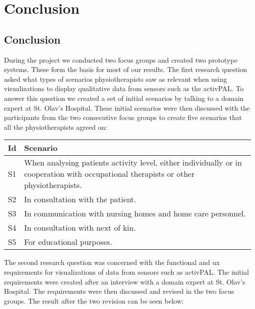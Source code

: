 \chapter{Conclusion}



\section{Conclusion}
During the project we conducted two focus groups and created two prototype systems. These form the basis for most of our results. The first research question asked what types of scenarios physiotherapists saw as relevant when using visualizations to display qualitative data from sensors such as the activPAL. To answer this question we created a set of initial scenarios by talking to a domain expert at St. Olav's Hospital. These initial scenarios were then discussed with the participants from the two consecutive focus groups to create five scenarios that all the physiotherapists agreed on:
\begin{table}[h!]
  \begin{tabular}{|c|p{10cm}|}
    \hline
    \textbf{Id} & \textbf{Scenario} \\ \hline
    S1 & When analysing patients activity level, either individually or in cooperation with occupational therapists or other physiotherapists. \\ \hline
    S2 & In consultation with the patient. \\ \hline
    S3 & In communication with nursing homes and home care personnel. \\ \hline
    S4 & In consultation with next of kin. \\ \hline
    S5 & For educational purposes. \\ \hline
  \end{tabular}
\end{table}

The second research question was concerned with the functional and \gls{ux} requirements for visualizations of data from sensors such as activPAL. The initial requirements were created after an interview with a domain expert at St. Olav's Hospital. The requirements were then discussed and revised in the two focus groups. The result after the two revision can be seen below:

